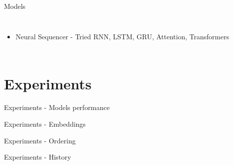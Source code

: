 \documentclass{beamer}
\begin{document}
\begin{frame}{Models}
\begin{columns}[c]
\begin{itemize}
    \item Neural Sequencer - Tried RNN, LSTM, GRU, Attention, Transformers
\end{itemize}
\end{columns}

\end{frame}


\section{Experiments}
\begin{frame}{Experiments - Models performance}

\end{frame}

\begin{frame}{Experiments - Embeddings}

\end{frame}

\begin{frame}{Experiments - Ordering}

\end{frame}

\begin{frame}{Experiments - History}

\end{frame}
\end{document}
